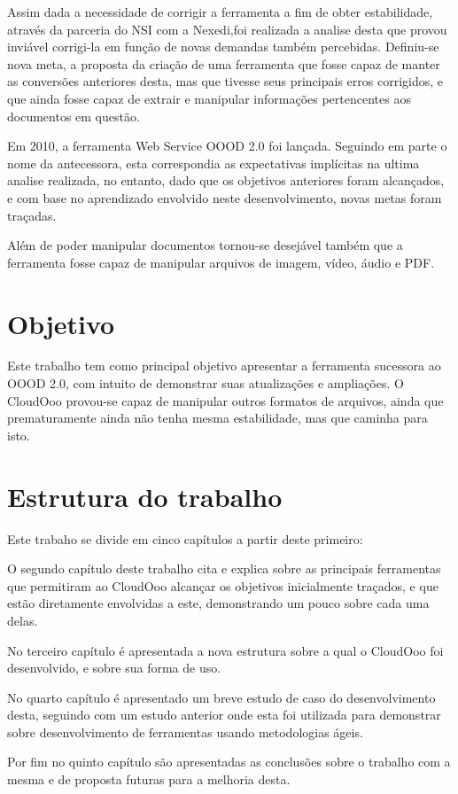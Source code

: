 Assim dada a necessidade de corrigir a ferramenta a fim de obter estabilidade, através da parceria do NSI com a Nexedi,foi realizada a analise desta que provou inviável corrigi-la em função de novas demandas também percebidas. Definiu-se nova meta, a proposta da criação de uma ferramenta que fosse capaz de manter as conversões anteriores desta, mas que tivesse seus principais erros corrigidos, e que ainda fosse capaz de extrair e manipular informações pertencentes aos documentos em questão.

Em 2010, a ferramenta Web Service OOOD 2.0 foi lançada. Seguindo em parte o nome da antecessora, esta correspondia as expectativas implícitas na ultima analise realizada, no entanto, dado que os objetivos anteriores foram alcançados, e com base no aprendizado envolvido neste desenvolvimento, novas metas foram traçadas.

Além de poder manipular documentos tornou-se desejável também que a ferramenta fosse capaz de manipular arquivos de imagem, vídeo, áudio e PDF.

\section{Objetivo}

Este trabalho tem como principal objetivo apresentar a ferramenta sucessora ao OOOD 2.0, com intuito de demonstrar suas atualizações e ampliações. O CloudOoo provou-se capaz de manipular outros formatos de arquivos, ainda que prematuramente ainda não tenha mesma estabilidade, mas que caminha para isto.

\section{Estrutura do trabalho}

Este trabaho se divide em cinco capítulos a partir deste primeiro:

O segundo capítulo deste trabalho cita e explica sobre as principais ferramentas que permitiram ao CloudOoo alcançar os objetivos inicialmente traçados, e que estão diretamente envolvidas a este, demonstrando um pouco sobre cada uma delas.

No terceiro capítulo é apresentada a nova estrutura sobre a qual o CloudOoo foi desenvolvido, e sobre sua forma de uso.

No quarto capítulo é apresentado um breve estudo de caso do desenvolvimento desta, seguindo com um estudo anterior onde esta foi utilizada para demonstrar sobre desenvolvimento de ferramentas usando metodologias ágeis.

Por fim no quinto capítulo são apresentadas as conclusões sobre o trabalho com a mesma e de proposta futuras para a melhoria desta.
